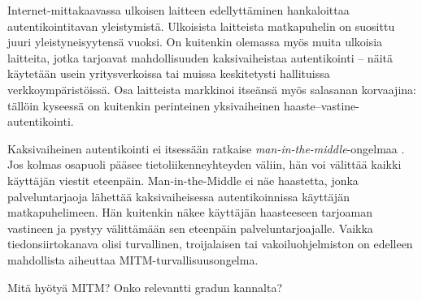 \documentclass[finnish,gradu]{tktltiki}
\begin{document}
  Internet-mittakaavassa ulkoisen laitteen edellyttäminen hankaloittaa autentikointitavan yleistymistä. Ulkoisista laitteista matkapuhelin on suosittu juuri yleistyneisyytensä vuoksi. On kuitenkin olemassa myös muita ulkoisia laitteita, jotka tarjoavat mahdollisuuden kaksivaiheistaa autentikointi -- näitä käytetään usein yritysverkoissa tai muissa keskitetysti hallituissa verkkoympäristöissä. Osa laitteista markkinoi itseänsä myös salasanan korvaajina: tällöin kyseessä on kuitenkin perinteinen yksivaiheinen haaste--vastine-autentikointi.

  Kaksivaiheinen autentikointi ei itsessään ratkaise \emph{man-in-the-middle}-ongelmaa \cite{schneier_2factor_2005}.
  Jos kolmas osapuoli pääsee tietoliikenneyhteyden väliin, hän voi välittää kaikki käyttäjän viestit eteenpäin. Man-in-the-Middle ei näe haastetta, jonka palveluntarjaoja lähettää kaksivaiheisessa autentikoinnissa käyttäjän matkapuhelimeen. Hän kuitenkin näkee käyttäjän haasteeseen tarjoaman vastineen ja pystyy välittämään sen eteenpäin palveluntarjoajalle. Vaikka tiedonsiirtokanava olisi turvallinen, troijalaisen tai vakoiluohjelmiston on edelleen mahdollista aiheuttaa MITM-turvallisuusongelma.

  Mitä hyötyä MITM? Onko relevantti gradun kannalta?
\end{document}
